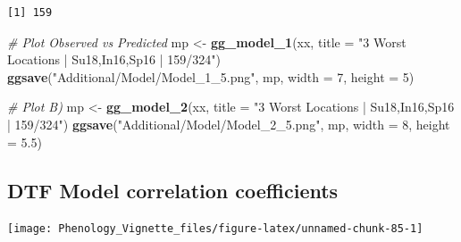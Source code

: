 \documentclass[
]{article}
\newenvironment{Shaded}{\begin{snugshade}}{\end{snugshade}}
\newcommand{\CommentTok}[1]{\textcolor[rgb]{0.56,0.35,0.01}{\textit{#1}}}
\newcommand{\DataTypeTok}[1]{\textcolor[rgb]{0.13,0.29,0.53}{#1}}
\newcommand{\DecValTok}[1]{\textcolor[rgb]{0.00,0.00,0.81}{#1}}
\newcommand{\FloatTok}[1]{\textcolor[rgb]{0.00,0.00,0.81}{#1}}
\newcommand{\KeywordTok}[1]{\textcolor[rgb]{0.13,0.29,0.53}{\textbf{#1}}}
\newcommand{\NormalTok}[1]{#1}
\newcommand{\OperatorTok}[1]{\textcolor[rgb]{0.81,0.36,0.00}{\textbf{#1}}}
\newcommand{\StringTok}[1]{\textcolor[rgb]{0.31,0.60,0.02}{#1}}
\begin{document}
\begin{Shaded}
\end{Shaded}

\begin{verbatim}
[1] 159
\end{verbatim}

\begin{Shaded}
\begin{Highlighting}[]
\CommentTok{# Plot Observed vs Predicted}
\NormalTok{mp <-}\StringTok{ }\KeywordTok{gg_model_1}\NormalTok{(xx, }\DataTypeTok{title =} \StringTok{"3 Worst Locations | Su18,In16,Sp16 | 159/324"}\NormalTok{)}
\KeywordTok{ggsave}\NormalTok{(}\StringTok{"Additional/Model/Model_1_5.png"}\NormalTok{, mp, }\DataTypeTok{width =} \DecValTok{7}\NormalTok{, }\DataTypeTok{height =} \DecValTok{5}\NormalTok{)}
\end{Highlighting}
\end{Shaded}

\begin{Shaded}
\begin{Highlighting}[]
\CommentTok{# Plot B)}
\NormalTok{mp <-}\StringTok{ }\KeywordTok{gg_model_2}\NormalTok{(xx, }\DataTypeTok{title =} \StringTok{"3 Worst Locations | Su18,In16,Sp16 | 159/324"}\NormalTok{)}
\KeywordTok{ggsave}\NormalTok{(}\StringTok{"Additional/Model/Model_2_5.png"}\NormalTok{, mp, }\DataTypeTok{width =} \DecValTok{8}\NormalTok{, }\DataTypeTok{height =} \FloatTok{5.5}\NormalTok{)}
\end{Highlighting}
\end{Shaded}

\hypertarget{dtf-model-correlation-coefficients}{%
\subsection{DTF Model correlation
coefficients}\label{dtf-model-correlation-coefficients}}

\texttt{[image: Phenology\_Vignette\_files/figure-latex/unnamed-chunk-85-1]}
\end{document}
